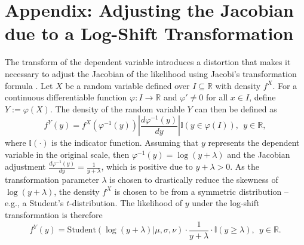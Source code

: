 \chapter{Appendix: Adjusting the Jacobian due to a Log-Shift Transformation}
\label{appendix:jacobian}

The transform of the dependent variable introduces a distortion that makes it necessary to adjust the Jacobian of the likelihood using Jacobi's transformation formula \cite[Theorem 12.6]{jacod_probability_2004}.
Let $X$ be a random variable defined over $I \subseteq \mathbb{R}$ with density $f^X$. For a continuous differentiable function $\varphi: I \rightarrow \mathbb{R}$ and $\varphi' \ne 0$ for all $x \in I$, define $Y := \varphi(X)$.
The density of the random variable $Y$ can then be defined as
\begin{equation*}
    f^Y(y) = f^X(\varphi^{-1}(y))
    \left|\displaystyle \frac{d \varphi^{-1}(y)}{dy}\right|
    \mathbb{I}(y \in \varphi(I)), ~~ y \in \mathbb{R},
\end{equation*}
where $\mathbb{I}(\cdot)$ is the indicator function.
Assuming that $y$ represents the dependent variable in the original scale, then $\varphi^{-1}(y) = \log(y + \lambda)$ and the Jacobian adjustment $\displaystyle \frac{d \varphi^{-1}(y)}{dy} = \frac{1}{y + \lambda}$, which is positive due to $y + \lambda > 0$. As the transformation parameter $\lambda$ is chosen to drastically reduce the skewness of $\log(y + \lambda)$, the density $f^X$ is chosen to be from a symmetric distribution – e.g., a Student's $t$-distribution. The likelihood of $y$ under the log-shift transformation is therefore
\begin{equation}
    \displaystyle f^Y(y) = \text{Student}(\log(y + \lambda)| \mu , \sigma, \nu)
    \cdot \frac{1}{y + \lambda}
    \cdot\mathbb{I}(y \ge \lambda), ~~ y \in \mathbb{R}.
\end{equation}